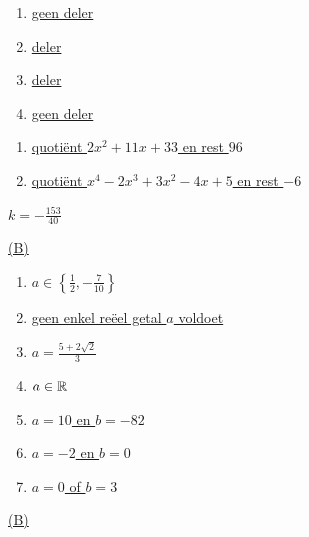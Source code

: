 \documentclass{ximera}
\begin{document}
\begin{Antwoord} \label{antw3.3}
\begin{enumerate}
\item
\hyperlink{oef3.3}{geen deler}
\item
\hyperlink{oef3.3}{deler}
\item
\hyperlink{oef3.3}{deler}
\item
\hyperlink{oef3.3}{geen deler}
\end{enumerate}
\end{Antwoord}

\begin{Antwoord} \label{antw3.4}
\begin{enumerate}
\item
\hyperlink{oef3.4}{quotiënt $2x^2+11x+33$ en rest $96$}
\item
\hyperlink{oef3.4}{quotiënt $x^4-2x^3+3x^2-4x+5$ en rest $-6$}
\end{enumerate}
\end{Antwoord}

\begin{Antwoord} \label{antw3.5}
\hyperlink{oef3.5}{$k = - \frac{153}{40}$}
\end{Antwoord}

\begin{Antwoord} \label{antw3.6}
\hyperlink{oef3.6}{(B)}
\end{Antwoord}

\begin{Antwoord} \label{antw3.7}
\begin{enumerate}
\item
\hyperlink{oef3.7}{$a \in \left\{\frac{1}{2}, -\frac{7}{10}\right\}$}
\item
\hyperlink{oef3.7}{geen enkel reëel getal $a$ voldoet}
\item
\hyperlink{oef3.7}{$a = \frac{5+2\sqrt{2}}{3}$}
\item
\hyperlink{oef3.7}{$a \in \mathbb{R}$}
\item
\hyperlink{oef3.7}{$a = 10$ en $b = -82$}
\item
\hyperlink{oef3.7}{$a = -2$ en $b = 0$}
\item
\hyperlink{oef3.7}{$a = 0$ of $b = 3$}
\end{enumerate}
\end{Antwoord}

\begin{Antwoord} \label{antw3.8}
\hyperlink{oef3.8}{(B)}
\end{Antwoord}
\end{document}
